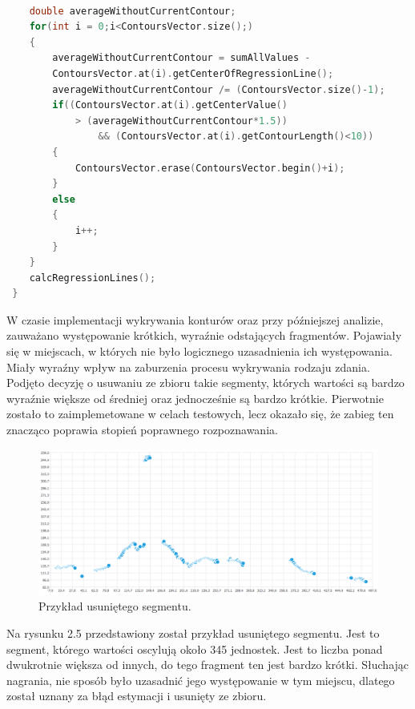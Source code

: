 \documentclass[a4paper,12 pt]{report}
\begin{document}
\begin{lstlisting}[caption={Dalsza część głównej funkcji findContours},label={lst:label},language=C++]

    double averageWithoutCurrentContour;
    for(int i = 0;i<ContoursVector.size();)
    {
        averageWithoutCurrentContour = sumAllValues - 
        ContoursVector.at(i).getCenterOfRegressionLine();
        averageWithoutCurrentContour /= (ContoursVector.size()-1);
        if((ContoursVector.at(i).getCenterValue() 
        	> (averageWithoutCurrentContour*1.5))
                && (ContoursVector.at(i).getContourLength()<10))
        {
            ContoursVector.erase(ContoursVector.begin()+i);
        }
        else
        {
            i++;
        }
    }
    calcRegressionLines();
 }
\end{lstlisting}
W czasie implementacji wykrywania konturów oraz przy późniejszej analizie, zauważano występowanie krótkich, wyraźnie odstających fragmentów. Pojawiały się w miejscach, w których nie było logicznego uzasadnienia ich występowania. Miały wyraźny wpływ na zaburzenia procesu wykrywania rodzaju zdania.
Podjęto decyzję o usuwaniu ze zbioru takie segmenty, których wartości są bardzo wyraźnie większe od średniej oraz jednocześnie są bardzo krótkie. Pierwotnie zostało to zaimplemetowane w celach testowych, lecz okazało się, że zabieg ten znacząco poprawia stopień poprawnego rozpoznawania.
 \FloatBarrier
\begin{figure}[h]
\centering
\includegraphics[scale=0.55]{usuniety_kontur.png}
\caption{Przykład usuniętego segmentu.}
\end{figure}
\FloatBarrier
Na rysunku 2.5 przedstawiony został przykład usuniętego segmentu. Jest to segment, którego wartości oscylują około 345 jednostek. Jest to liczba ponad dwukrotnie większa od innych, do tego fragment ten jest bardzo krótki.
Słuchając nagrania, nie sposób było uzasadnić jego występowanie w tym miejscu, dlatego został uznany za błąd estymacji i usunięty ze zbioru. 
\end{document}

